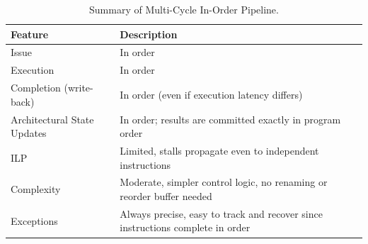 \begin{table}[!htp]
    \centering
    \begin{tabular}{@{} l p{21em} @{}}
        \toprule
        \textbf{Feature} & \textbf{Description} \\
        \midrule
        Issue                       & In order                                                                       \\ [.5em]
        Execution                   & In order                                                                       \\ [.5em]
        Completion (write-back)     & In order (even if execution latency differs)                                   \\ [.5em]
        Architectural State Updates & In order; results are committed exactly in program order                       \\ [.5em]
        ILP                         & Limited, stalls propagate even to independent instructions                     \\ [.5em]
        Complexity                  & Moderate, simpler control logic, no renaming or reorder buffer needed          \\ [.5em]
        Exceptions                  & Always precise, easy to track and recover since instructions complete in order \\
        \bottomrule
    \end{tabular}
    \caption{Summary of Multi-Cycle In-Order Pipeline.}
\end{table}